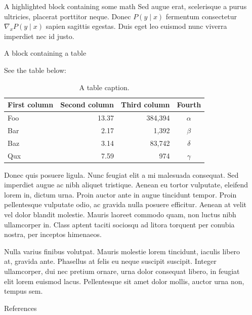 \documentclass[final]{beamer}
\newlength{\sepwidth}
\newlength{\colwidth}
\newcommand{\separatorcolumn}{\begin{column}{\sepwidth}\end{column}}
\begin{document}
\begin{frame}[t]
\begin{columns}[t]
\begin{column}{\colwidth}
\begin{exampleblock}{A highlighted block containing some math}
    Sed augue erat, scelerisque a purus ultricies, placerat porttitor neque.
    Donec $P(y \mid x)$ fermentum consectetur $\nabla_x P(y \mid x)$ sapien
    sagittis egestas. Duis eget leo euismod nunc viverra imperdiet nec id
    justo.

  \end{exampleblock}

  \begin{block}{A block containing a table}

    See the table below:

    \begin{table}
      \centering
      \begin{tabular}{l r r c}
        \toprule
        \textbf{First column} & \textbf{Second column} & \textbf{Third column} & \textbf{Fourth} \\
        \midrule
        Foo & 13.37 & 384,394 & $\alpha$ \\
        Bar & 2.17 & 1,392 & $\beta$ \\
        Baz & 3.14 & 83,742 & $\delta$ \\
        Qux & 7.59 & 974 & $\gamma$ \\
        \bottomrule
      \end{tabular}
      \caption{A table caption.}
    \end{table}

    Donec quis posuere ligula. Nunc feugiat elit a mi malesuada consequat. Sed
    imperdiet augue ac nibh aliquet tristique. Aenean eu tortor vulputate,
    eleifend lorem in, dictum urna. Proin auctor ante in augue tincidunt
    tempor. Proin pellentesque vulputate odio, ac gravida nulla posuere
    efficitur. Aenean at velit vel dolor blandit molestie. Mauris laoreet
    commodo quam, non luctus nibh ullamcorper in. Class aptent taciti sociosqu
    ad litora torquent per conubia nostra, per inceptos himenaeos.

    Nulla varius finibus volutpat. Mauris molestie lorem tincidunt, iaculis
    libero at, gravida ante. Phasellus at felis eu neque suscipit suscipit.
    Integer ullamcorper, dui nec pretium ornare, urna dolor consequat libero,
    in feugiat elit lorem euismod lacus. Pellentesque sit amet dolor mollis,
    auctor urna non, tempus sem.

  \end{block}

  \begin{block}{References}

    \nocite{*}   %
    \footnotesize{}

  \end{block}

\end{column}

\separatorcolumn
\end{columns}
\end{frame}
\end{document}

